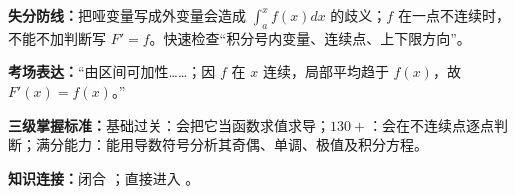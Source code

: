 \begin{knowledgeBox}
\textbf{失分防线：}把哑变量写成外变量会造成 \(\int_a^x f(x)dx\) 的歧义；\(f\) 在一点不连续时，不能不加判断写 \(F'=f\)。快速检查“积分号内变量、连续点、上下限方向”。

\textbf{考场表达：}“由区间可加性……；因 \(f\) 在 \(x\) 连续，局部平均趋于 \(f(x)\)，故 \(F'(x)=f(x)\)。”

\textbf{三级掌握标准：}基础过关：会把它当函数求值求导；\(130+\)：会在不连续点逐点判断；满分能力：能用导数符号分析其奇偶、单调、极值及积分方程。

\textbf{知识连接：}闭合 ；直接进入 。
\end{knowledgeBox}


\par

